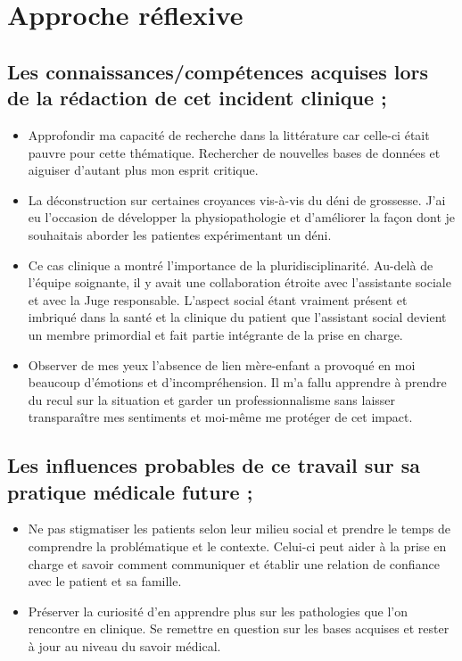 \section{Approche réflexive}
\subsection{Les connaissances/compétences acquises lors de la rédaction de cet incident clinique ;}
\begin{itemize}[label=\textbullet]
    \item Approfondir ma capacité de recherche dans la littérature car celle-ci était pauvre pour cette thématique. Rechercher de nouvelles bases de données et aiguiser d’autant plus mon esprit critique.
    \item La déconstruction sur certaines croyances vis-à-vis du déni de grossesse. J’ai eu l’occasion de développer la physiopathologie et d’améliorer la façon dont je souhaitais aborder les patientes expérimentant un déni. 
    \item Ce cas clinique a montré l’importance de la pluridisciplinarité. Au-delà de l’équipe soignante, il y avait une collaboration étroite avec l’assistante sociale et avec la Juge responsable. L’aspect social étant vraiment présent et imbriqué dans la santé et la clinique du patient que l’assistant social devient un membre primordial et fait partie intégrante de la prise en charge. 
    \item Observer de mes yeux l’absence de lien mère-enfant a provoqué en moi beaucoup d’émotions et d’incompréhension. Il m’a fallu apprendre à prendre du recul sur la situation et garder un professionnalisme sans laisser transparaître mes sentiments et moi-même me protéger de cet impact.
\end{itemize}

\subsection{Les influences probables de ce travail sur sa pratique médicale future ;}

\begin{itemize}[label=\textbullet]
    \item Ne pas stigmatiser les patients selon leur milieu social et prendre le temps de comprendre la problématique et le contexte. Celui-ci peut aider à la prise en charge et savoir comment communiquer et établir une relation de confiance avec le patient et sa famille.
    \item Préserver la curiosité d’en apprendre plus sur les pathologies que l’on rencontre en clinique. Se remettre en question sur les bases acquises et rester à jour au niveau du savoir médical.
\end{itemize}

